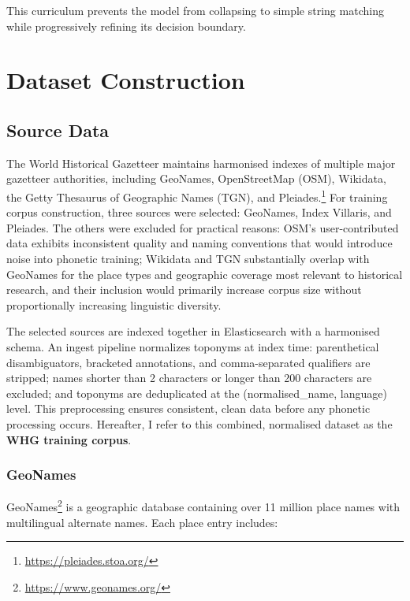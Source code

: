 \documentclass[11pt]{article}
\begin{document}
    This curriculum prevents the model from collapsing to simple string matching while progressively refining its decision boundary.



    \section{Dataset Construction}
    \label{sec:dataset}

    \subsection{Source Data}

    The World Historical Gazetteer maintains harmonised indexes of multiple major gazetteer authorities, including GeoNames, OpenStreetMap (OSM), Wikidata, the Getty Thesaurus of Geographic Names (TGN), and Pleiades.\footnote{\url{https://pleiades.stoa.org/}} For training corpus construction, three sources were selected: GeoNames, Index Villaris, and Pleiades. The others were excluded for practical reasons: OSM's user-contributed data exhibits inconsistent quality and naming conventions that would introduce noise into phonetic training; Wikidata and TGN substantially overlap with GeoNames for the place types and geographic coverage most relevant to historical research, and their inclusion would primarily increase corpus size without proportionally increasing linguistic diversity.

    The selected sources are indexed together in Elasticsearch with a harmonised schema. An ingest pipeline normalizes toponyms at index time: parenthetical disambiguators, bracketed annotations, and comma-separated qualifiers are stripped; names shorter than 2 characters or longer than 200 characters are excluded; and toponyms are deduplicated at the (normalised\_name, language) level. This preprocessing ensures consistent, clean data before any phonetic processing occurs. Hereafter, I refer to this combined, normalised dataset as the \textbf{WHG training corpus}.

    \subsubsection{GeoNames}

    GeoNames\footnote{\url{https://www.geonames.org/}} is a geographic database containing over 11 million place names with multilingual alternate names. Each place entry includes:
\end{document}
